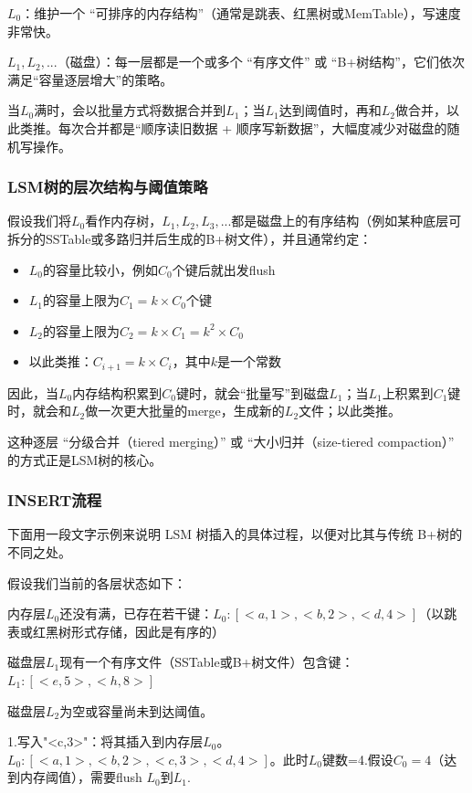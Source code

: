 $L_0$：维护一个 “可排序的内存结构”（通常是跳表、红黑树或MemTable），写速度非常快。

$L_1,L_2,...$（磁盘）：每一层都是一个或多个 “有序文件” 或 “B+树结构”，它们依次满足“容量逐层增大”的策略。

当$L_0$满时，会以批量方式将数据合并到$L_1$；当$L_1$达到阈值时，再和$L_2$做合并，以此类推。每次合并都是“顺序读旧数据 + 顺序写新数据”，大幅度减少对磁盘的随机写操作。

\subsubsection{LSM树的层次结构与阈值策略}

假设我们将$L_0$看作内存树，$L_1,L_2,L_3,...$都是磁盘上的有序结构（例如某种底层可拆分的SSTable或多路归并后生成的B+树文件），并且通常约定：

\begin{itemize}
    \item $L_0$的容量比较小，例如$C_0$个键后就出发flush
    \item $L_1$的容量上限为$C_1=k\times C_0$个键
    \item $L_2$的容量上限为$C_2=k\times C_1=k^2\times C_0$
    \item 以此类推：$C_{i+1}=k\times C_i$，其中$k$是一个常数
\end{itemize}

因此，当$L_0$内存结构积累到$C_0$键时，就会“批量写”到磁盘$L_1$；当$L_1$上积累到$C_1$键时，就会和$L_2$做一次更大批量的merge，生成新的$L_2$文件；以此类推。

这种逐层 “分级合并（tiered merging）” 或 “大小归并（size-tiered compaction）” 的方式正是LSM树的核心。

\subsubsection{INSERT流程}

下面用一段文字示例来说明 LSM 树插入的具体过程，以便对比其与传统 B+树的不同之处。

假设我们当前的各层状态如下：

内存层$L_0$还没有满，已存在若干键：$L_0:[<a,1>,<b,2>,<d,4>]$（以跳表或红黑树形式存储，因此是有序的）

磁盘层$L_1$现有一个有序文件（SSTable或B+树文件）包含键：$L_1:[<e,5>,<h,8>]$

磁盘层$L_2$为空或容量尚未到达阈值。

\noindent 1.写入"<c,3>"：将其插入到内存层$L_0$。$L_0:[<a,1>,<b,2>,<c,3>,<d,4>]$。此时$L_0$键数=4.假设$C_0=4$（达到内存阈值），需要flush $L_0$到$L_1$.

